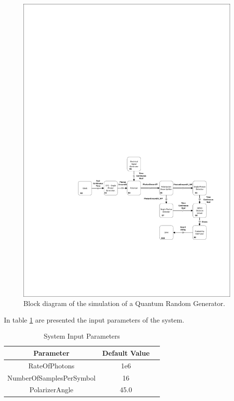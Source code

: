 \begin{figure}[h]
    \centering
        \includegraphics[clip, trim=5cm 5cm 0.5cm 15cm, width=1.00\textwidth]{./sdf/qrng/figures_raw/Simulation_qrng.pdf}
    \caption{Block diagram of the simulation of a Quantum Random Generator.}\label{sim_qrng}
\end{figure}

In table \ref{tb:inputparameters2} are presented the input parameters of the system.


\begin{table}[H]
\centering
\caption{System Input Parameters}
\label{tb:inputparameters2}
\begin{tabular}{|c|c|c|}
\hline
\textbf{Parameter}                      & \textbf{Default Value}                                       \\ \hline
RateOfPhotons                           & 1e6                                                          \\ \hline
NumberOfSamplesPerSymbol                & 16                                                           \\ \hline
PolarizerAngle                          & 45.0                                                         \\ \hline

\end{tabular}
\end{table}

